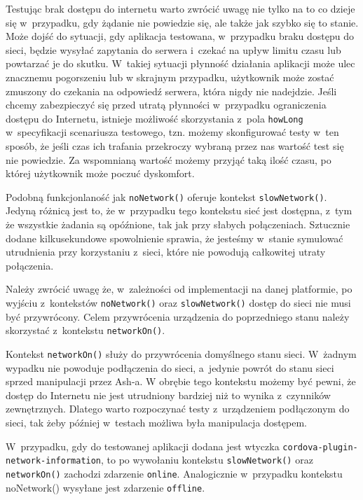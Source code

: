 \documentclass[brudnopis]{xmgr}
\begin{document}
Testując brak dostępu do internetu warto zwrócić uwagę nie tylko na to co dzieje się w~przypadku, gdy żądanie nie powiedzie się, ale także jak szybko się to stanie. Może dojść do sytuacji, gdy aplikacja testowana, w~przypadku braku dostępu do sieci, będzie wysyłać zapytania do serwera i~czekać na upływ limitu czasu lub powtarzać je do skutku. W~takiej sytuacji płynność działania aplikacji może ulec znacznemu pogorszeniu lub w skrajnym przypadku, użytkownik może zostać zmuszony do czekania na odpowiedź serwera, która nigdy nie nadejdzie. Jeśli chcemy zabezpieczyć się przed utratą płynności w~przypadku ograniczenia dostępu do Internetu, istnieje możliwość skorzystania z~pola \texttt{howLong} w~specyfikacji scenariusza testowego, tzn. możemy skonfigurować testy w~ten sposób, że jeśli czas ich trafania przekroczy wybraną przez nas wartość test się nie powiedzie. Za wspomnianą wartość możemy przyjąć taką ilość czasu, po której użytkownik może poczuć dyskomfort. 

Podobną funkcjonlaność jak \texttt{noNetwork()} oferuje kontekst \texttt{slowNetwork()}. Jedyną różnicą jest to, że w~przypadku tego kontekstu sieć jest dostępna, z~tym że wszystkie żadania są opóźnione, tak jak przy słabych połączeniach. Sztucznie dodane kilkusekundowe spowolnienie sprawia, że jesteśmy w~stanie symulować utrudnienia przy korzystaniu z~sieci, które nie powodują całkowitej utraty połączenia. 

Należy zwrócić uwagę że, w~zależności od implementacji na danej platformie, po wyjściu z~kontekstów \texttt{noNetwork()} oraz \texttt{slowNetwork()} dostęp do sieci nie musi być przywrócony. Celem przywrócenia urządzenia do poprzedniego stanu należy skorzystać z~kontekstu \texttt{networkOn()}. 

Kontekst \texttt{networkOn()} służy do przywrócenia domyślnego stanu sieci. W~żadnym wypadku nie powoduje podłączenia do sieci, a~jedynie powrót do stanu sieci sprzed manipulacji przez Ash-a. W obrębie tego kontekstu możemy być pewni, że dostęp do Internetu nie jest utrudniony bardziej niż to wynika z~czynników zewnętrznych. Dlatego warto rozpoczynać testy z~urządzeniem podłączonym do sieci, tak żeby później w~testach możliwa była manipulacja dostępem.

W~przypadku, gdy do testowanej aplikacji dodana jest wtyczka \texttt{cordova-plugin-network-information},  to po wywołaniu kontekstu \texttt{slowNetwork()} oraz \texttt{networkOn()} zachodzi zdarzenie \texttt{online}. Analogicznie w~przypadku kontekstu noNetwork() wysyłane jest zdarzenie \texttt{offline}. 
\end{document}
